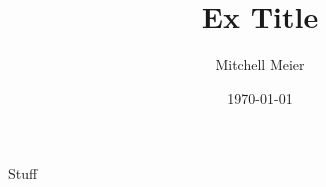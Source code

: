 \documentclass[14pt]{article}
\title{Ex Title}
\author{Mitchell Meier}
\date{\today}
\begin{document}
\maketitle

Stuff
\end{document}
